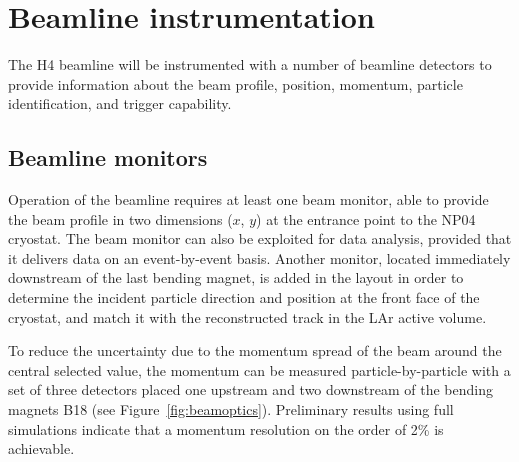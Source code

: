 \section{Beamline instrumentation}
\label{sec:beaminstruments}

The H4 beamline will be instrumented with a number of beamline detectors to provide information 
 about the beam profile, position, momentum, particle identification, and trigger capability. 

\subsection{Beamline monitors}

Operation of the beamline requires at least one beam monitor, able to provide the beam profile in two dimensions ($x$, $y$) at the entrance point to the NP04 cryostat.   The beam monitor can also be exploited for data analysis, provided that it delivers data on an event-by-event basis. Another monitor, located immediately downstream of the last bending magnet, is added in the layout  in order to determine the incident particle  direction and position at the front face of the cryostat, and match it with the reconstructed track in the LAr active volume.

To reduce the uncertainty due to the momentum spread of the beam around the central selected value, the momentum can be measured particle-by-particle
with a set of three detectors placed one upstream and two downstream of the bending magnets B18 (see Figure~\ref{fig:beamoptics}).  
Preliminary results using full simulations indicate that a momentum resolution on the order of  2\% is achievable. 
%

